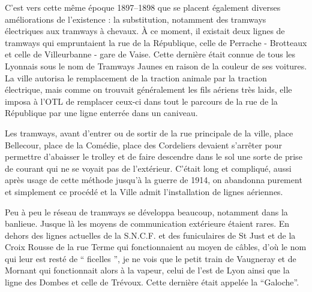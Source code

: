 \documentclass[11pt,a4paper]{report}
\begin{document}
C'est vers cette même époque 1897--1898 que se placent également diverses améliorations de l'existence : la substitution, notamment des tramways électriques aux tramways à chevaux. À ce moment, il existait deux lignes de tramways qui empruntaient la rue de la République, celle de Perrache - Brotteaux et celle de Villeurbanne - gare de Vaise. Cette dernière était connue de tous les Lyonnais sous le nom de Tramways Jaunes en raison de la couleur de ses voitures. La ville autorisa le remplacement de la traction animale par la traction électrique, mais comme on trouvait généralement les fils aériens très laids, elle imposa à l'OTL de remplacer ceux-ci dans tout le parcours de la rue de la République par une ligne enterrée dans un caniveau.

Les tramways, avant d'entrer ou de sortir de la rue principale de la ville, place Bellecour, place de la Comédie, place des Cordeliers devaient s'arrêter pour permettre d'abaisser le trolley et de faire descendre dans le sol une sorte de prise de courant qui ne se voyait pas de l'extérieur. C'était long et compliqué, aussi après usage de cette méthode jusqu'à la guerre de 1914, on abandonna purement et simplement ce procédé et la Ville admit l'installation de lignes aériennes.

Peu à peu le réseau de tramways se développa beaucoup, notamment dans la banlieue. Jusque là les moyens de communication extérieure étaient rares. En dehors des lignes actuelles de la S.N.C.F. et des funiculaires de St Just et de la Croix Rousse de la rue Terme qui fonctionnaient au moyen de câbles, d'où le nom qui leur est resté de `` ficelles '', je ne vois que le petit train de Vaugneray et de Mornant qui fonctionnait alors à la vapeur, celui de l'est de Lyon ainsi que la ligne des Dombes et celle de Trévoux. Cette dernière était appelée la ``Galoche''.
\end{document}
